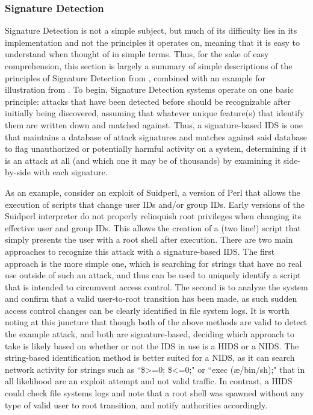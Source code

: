 \documentclass{acm_proc_article-sp}
\begin{document}
	    \subsubsection{Signature Detection} 
	    	Signature Detection is not a simple subject, but much of its difficulty lies in its implementation and not the principles it operates on, meaning that it is easy to understand when thought of in simple terms. Thus, for the sake of easy comprehension, this section is largely a summary of simple descriptions of the principles of Signature Detection from \cite{Taylor2006}, combined with an example for illustration from \cite{Labs1999}. To begin, Signature Detection systems operate on one basic principle: attacks that have been detected before should be recognizable after initially being discovered, assuming that whatever unique feature(s) that identify them are written down and matched against. Thus, a signature-based IDS is one that maintains a database of attack signatures and matches against said database to flag unauthorized or potentially harmful activity on a system, determining if it is an attack at all (and which one it may be of thousands) by examining it side-by-side with each signature. 
	    	
	    	As an example, consider an exploit of Suidperl, a version of Perl that allows the execution of scripts that change user IDs and/or group IDs. Early versions of the Suidperl interpreter do not properly relinquish  root privileges when changing its effective user and group IDs. This allows the creation of a (two line!) script that simply presents the user with a root shell after execution. There are two main approaches to recognize this attack with a signature-based IDS. The first approach is the more simple one, which is searching for strings that have no real use outside of such an attack, and thus can be used to uniquely identify a script that is intended to circumvent access control. The second is to analyze the system and confirm that a valid user-to-root transition has been made, as such sudden access control changes can be clearly identified in file system logs. It is worth noting at this juncture that though both of the above methods are valid to detect the example attack, and both are signature-based, deciding which approach to take is likely based on whether or not the IDS in use is a HIDS or a NIDS. The string-based identification method is better suited for a NIDS, as it can search network activity for strings such as ``\$>=0; \$<=0;" or ``exec (\ae/bin/sh);" that in all likelihood are an exploit attempt and not valid traffic. In contrast, a HIDS could check file systems logs and note that a root shell was spawned without any type of valid user to root transition, and notify authorities accordingly. 
	    	
\end{document}
